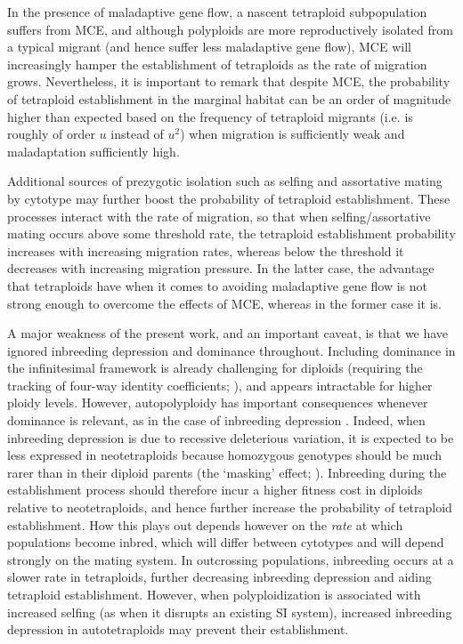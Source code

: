 \documentclass[12pt,a4paper]{article}
\begin{document}
In the presence of maladaptive gene flow, a nascent tetraploid subpopulation
suffers from MCE, and although polyploids are more reproductively isolated from
a typical migrant (and hence suffer less maladaptive gene flow), MCE will
increasingly hamper the establishment of tetraploids as the rate of migration
grows.
Nevertheless, it is important to remark that despite MCE, the probability of
tetraploid establishment in the marginal habitat can be an order of magnitude
higher than expected based on the frequency of tetraploid migrants (i.e. is
roughly of order $u$ instead of $u^2$) when migration is sufficiently weak and
maladaptation sufficiently high.

Additional sources of prezygotic isolation such as selfing and assortative
mating by cytotype may further boost the probability of tetraploid
establishment.
These processes interact with the rate of migration, so that when
selfing/assortative mating occurs above some threshold rate, the tetraploid
establishment probability increases with increasing migration rates, whereas
below the threshold it decreases with increasing migration pressure.
In the latter case, the advantage that tetraploids have when it comes to
avoiding maladaptive gene flow is not strong enough to overcome the effects of
MCE, whereas in the former case it is.

A major weakness of the present work, and an important caveat, is that we have
ignored inbreeding depression and dominance throughout.
Including dominance in the infinitesimal framework is already challenging for
diploids (requiring the tracking of four-way identity coefficients;
\cite{barton2023}), and appears intractable for higher ploidy levels.
However, autopolyploidy has important consequences whenever dominance is
relevant, as in the case of inbreeding depression
\citep{ronfort1999,gallais2003,husband2008,clo2022b}.
Indeed, when inbreeding depression is due to recessive deleterious variation,
it is expected to be less expressed in neotetraploids because homozygous genotypes
should be much rarer than in their diploid parents (the `masking' effect;
\cite{husband1997,otto2000}).
Inbreeding during the establishment process should therefore incur a higher
fitness cost in diploids relative to neotetraploids, and hence further increase
the probability of tetraploid establishment.
How this plays out depends however on the \textit{rate} at which populations
become inbred, which will differ between cytotypes and will depend strongly on
the mating system.
In outcrossing populations, inbreeding occurs at a slower rate in tetraploids,
further decreasing inbreeding depression and aiding tetraploid establishment.
However, when polyploidization is associated with increased selfing (as when it
disrupts an existing SI system), increased inbreeding depression in
autotetraploids may prevent their establishment. 
\end{document}

